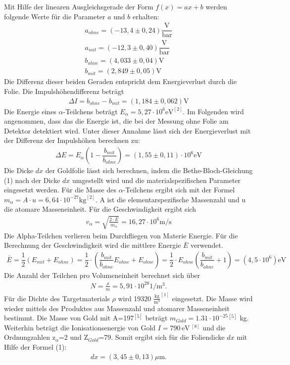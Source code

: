 \documentclass{article}
\begin{document}
Mit Hilfe der linearen Ausgleichsgerade der Form $f(x)=ax+b$ werden folgende Werte für die Parameter $a$ und $b$ erhalten:
\begin{align*}
a_{ohne}=( -13,4 \pm 0,24) \dfrac{\text{V}}{\text{bar}}\\
a_{mit}=(-12,3\pm 0,40)\dfrac{\text{V}}{\text{bar}}\\
b_{ohne}=(4,033\pm 0,04)\text{V}\\
b_{mit}=(2,849\pm 0,05)\text{V}
\end{align*}
Die Differenz dieser beiden Geraden entspricht dem Energieverlust durch die Folie.
Die Impulshöhendifferenz beträgt
\begin{align*}
\Delta I= b_{ohne}-b_{mit}=( 1,184\pm 0,062)\text{V}
\end{align*}
Die Energie eines $\alpha$-Teilchens beträgt $E_{\alpha}=5,27\cdot10^6 \text{eV}^{[2]}$.  Im Folgenden wird angenommen, dass das die Energie ist, die bei der Messung ohne Folie am Detektor detektiert wird. Unter dieser Annahme lässt sich der Energieverlust mit der Differenz der Impulshöhen berechnen zu:
\begin{align*}
	\Delta E= E_{\alpha} (1-\dfrac{b_{mit}}{b_{ohne}})= (1,55\pm 0,11) \cdot 10^6 \text{eV}
\end{align*}
Die Dicke $dx$ der Goldfolie lässt sich berechnen, indem die Bethe-Bloch-Gleichung (1) nach der Dicke $dx$ umgestellt wird und die materialspezifischen Parameter eingesetzt werden. Für die Masse des $\alpha$-Teilchens ergibt sich mit der Formel $m_{\alpha}=A\cdot u=6,64\cdot 10^{-27}\text{kg}^{[2]}$. A ist die elementarspezifische Massenzahl und u die atomare Masseneinheit. Für die Geschwindigkeit ergibt sich 
\begin{align*}
v_{\alpha}= \sqrt{\frac{2\cdot \bar{E}}{m_{\alpha}}} = 16,27\cdot10^6 \text{m/s}
\end{align*}
Die Alpha-Teilchen verlieren beim Durchfliegen von Materie Energie. Für die Berechnung der Geschwindigkeit wird die mittlere Energie $\bar{E}$ verwendet. 
\begin{align}
\bar{E}=\dfrac{1}{2}(E_{mit}+E_{ohne})=\dfrac{1}{2}\cdot \left(\dfrac{b_{mit}}{b_{ohne}}E_{ohne}+E_{ohne}\right)=\dfrac{1}{2}\cdot E_{ohne} \left(\dfrac{b_{mit}}{b_{ohne}}+1\right)=(4,5 \cdot 10^6) \text{eV}
\end{align}
Die Anzahl der Teilchen pro Volumeneinheit berechnet sich über 
\begin{align*}
N= \frac{\rho}{m}=5,91\cdot10^{28} \text{1/m$^3$}.
\end{align*}
Für die Dichte des Targetmaterials $\rho$ wird 19320 $\frac{\text{kg}}{\text{m}^3}^{[1]}$ eingesetzt. Die Masse wird wieder mittels des Produktes aus Massenzahl und atomarer Masseneinheit bestimmt. Die Masse von Gold mit A=197$^{[5]}$ beträgt $m_{Gold}=1.31 \cdot 10^{-25} $$^{[5]}$ kg. \\
Weiterhin beträgt die Ionisationsenergie von Gold $I=790\, \text{eV} \,^{[8]}$ und die Ordnungzahlen  z$_{\alpha}$=2 und Z$_{Gold}$=79. Somit ergibt sich für die Foliendicke $dx$ mit Hilfe der Formel (1):
\begin{align*}
dx=(3,45\pm 0,13) \mu\text{m}.
\end{align*}
\end{document}
